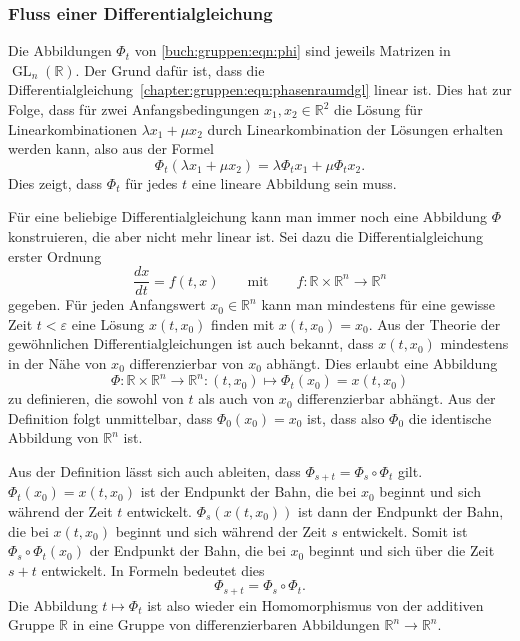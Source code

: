 \subsubsection{Fluss einer Differentialgleichung}
Die Abbildungen $\Phi_t$ von \eqref{buch:gruppen:eqn:phi} sind jeweils
Matrizen in $\operatorname{GL}_n(\mathbb{R})$.
Der Grund dafür ist, dass die
Differentialgleichung~\eqref{chapter:gruppen:eqn:phasenraumdgl}
linear ist.
Dies hat zur Folge, dass für zwei Anfangsbedingungen $x_1,x_2\in\mathbb{R}^2$
die Lösung für Linearkombinationen $\lambda x_1+\mu x_2$ durch
Linearkombination der Lösungen erhalten werden kann, also
aus der Formel
\[
\Phi_t (\lambda x_1 + \mu x_2) = \lambda \Phi_t x_1 + \mu \Phi_t x_2.
\]
Dies zeigt, dass $\Phi_t$ für jedes $t$ eine lineare Abbildung sein muss.

Für eine beliebige Differentialgleichung kann man immer noch eine Abbildung
$\Phi$ konstruieren, die aber nicht mehr linear ist.
Sei dazu die Differentialgleichung erster Ordnung
\begin{equation}
\frac{dx}{dt}
=
f(t,x)
\qquad\text{mit}\qquad
f\colon \mathbb{R}\times\mathbb{R}^n \to \mathbb{R}^n
\label{buch:gruppen:eqn:dgl}
\end{equation}
gegeben.
Für jeden Anfangswert $x_0\in\mathbb{R}^n$ kann man mindestens für eine
gewisse Zeit $t <\varepsilon$ eine Lösung $x(t,x_0)$ finden mit $x(t,x_0)=x_0$.
Aus der Theorie der gewöhnlichen Differentialgleichungen ist auch
bekannt, dass $x(t,x_0)$ mindestens in der Nähe von $x_0$ differenzierbar von
$x_0$ abhängt.
Dies erlaubt eine Abbildung
\[
\Phi\colon \mathbb{R}\times \mathbb{R}^n \to \mathbb{R}^n
:
(t,x_0) \mapsto \Phi_t(x_0) = x(t,x_0)
\]
zu definieren, die sowohl von $t$ als auch von $x_0$ differenzierbar
abhängt.
Aus der Definition folgt unmittelbar, dass $\Phi_0(x_0)=x_0$ ist, dass
also $\Phi_0$ die identische Abbildung von $\mathbb{R}^n$ ist.

Aus der Definition lässt sich auch ableiten, dass
$\Phi_{s+t}=\Phi_s\circ\Phi_t$ gilt.
$\Phi_t(x_0)=x(t,x_0)$ ist der Endpunkt der Bahn, die bei $x_0$ beginnt
und sich während der Zeit $t$ entwickelt.
$\Phi_s(x(t,x_0))$ ist dann der Endpunkt der Bahn, die bei $x(t,x_0)$ 
beginnt und sich während der Zeit $s$ entwickelt.
Somit ist $\Phi_s\circ \Phi_t(x_0)$ der Endpunkt der Bahn, die bei
$x_0$ beginnt und sich über die Zeit $s+t$ entwickelt.
In Formeln bedeutet dies
\[
\Phi_{s+t} = \Phi_s\circ \Phi_t.
\]
Die Abbildung $t\mapsto \Phi_t$ ist also wieder ein Homomorphismus
von der additiven Gruppe $\mathbb{R}$ in eine Gruppe von differenzierbaren
Abbildungen $\mathbb{R}^n\to\mathbb{R}^n$.


